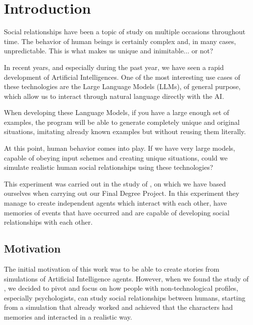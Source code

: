 \chapter*{Introduction}
\label{cap:introduction}


Social relationships have been a topic of study on multiple occasions throughout time. The behavior of human beings is certainly complex and, in many cases, unpredictable. This is what makes us unique and inimitable... or not?

In recent years, and especially during the past year, we have seen a rapid development of Artificial Intelligences. One of the most interesting use cases of these technologies are the Large Language Models (LLMs), of general purpose, which allow us to interact through natural language directly with the AI.

When developing these Language Models, if you have a large enough set of examples, the program will be able to generate completely unique and original situations, imitating already known examples but without reusing them literally.

At this point, human behavior comes into play. If we have very large models, capable of obeying input schemes and creating unique situations, could we simulate realistic human social relationships using these technologies?

This experiment was carried out in the study of \cite{park2023generative}, on which we have based ourselves when carrying out our Final Degree Project. In this experiment they manage to create independent agents which interact with each other, have memories of events that have occurred and are capable of developing social relationships with each other.

\section{Motivation}

The initial motivation of this work was to be able to create stories from simulations of Artificial Intelligence agents. However, when we found the study of \ga, we decided to pivot and focus on how people with non-technological profiles, especially psychologists, can study social relationships between humans, starting from a simulation that already worked and achieved that the characters had memories and interacted in a realistic way.

